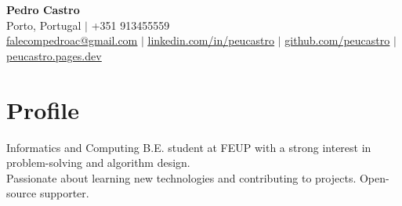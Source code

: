 






\begin{center}
  \textbf{\Huge Pedro Castro} \\ \vspace{6pt}
  \faMapMarker*{} \small{Porto, Portugal} $|$ \faPhone{} +351 913455559 \\ \vspace{2pt}
  \faEnvelope{} \href{mailto:falecompedroac@gmail.com}{\underline{falecompedroac@gmail.com}} $|$
  \faLinkedin{} \href{https://linkedin.com/in/peucastro}{\underline{linkedin.com/in/peucastro}} $|$
  \faGithub{} \href{https://github.com/peucastro}{\underline{github.com/peucastro}} $|$
  \faGlobe{} \href{https://peucastro.pages.dev/}{\underline{peucastro.pages.dev}}
\end{center}

\section{Profile}
\begin{itemize}[leftmargin=0.15in, label={}]
    \small{
    \item{
        Informatics and Computing B.E. student at FEUP with a strong interest in problem-solving and algorithm design. \\
        Passionate about learning new technologies and contributing to projects. Open-source supporter.
    }}
\end{itemize}

